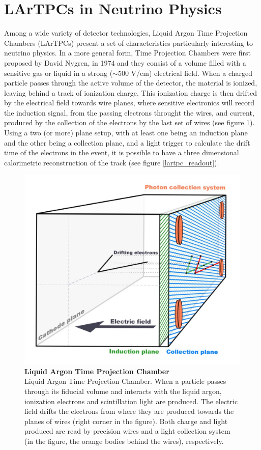 \section{LArTPCs in Neutrino Physics}
Among a wide variety of detector technologies, Liquid Argon Time Projection Chambers (LArTPCs) present a set of characteristics particularly interesting to neutrino physics. 
In a more general form, Time Projection Chambers were first proposed by David Nygren, in 1974 \cite{Nygren} and they consist of a volume filled with a sensitive gas or liquid in a strong ($\sim$500 V/cm) electrical field. When a charged particle passes through the active volume of the detector, the material is ionized, leaving behind a track of ionization charge. This ionization charge is then drifted by the electrical field towards wire planes, where sensitive electronics will record the induction signal, from the passing electrons throught the wires, and current, produced by the collection of the electrons by the last set of wires (see figure \ref{lartpc}). Using a two (or more) plane setup, with at least one being an induction plane and the other being a collection plane, and a light trigger to calculate the drift time of the electrons in the event, it is possible to have a three dimensional calorimetric reconstruction of the track (see figure \ref{lartpc_readout}).

\begin{figure}[h!]
	\begin{center}
		\includegraphics[scale=0.1]{Figures/LARTPC.jpg}
		\caption[LArTPC]{ {\textbf{Liquid Argon Time Projection Chamber}} \\ Liquid Argon Time Projection Chamber. When a particle passes through its fiducial volume and interacts with the liquid argon, ionization electrons and scintillation light are produced. The electric field drifts the electrons from where they are produced towards the planes of wires (right corner in the figure). Both charge and light produced are read by precision wires and a light collection system (in the figure, the orange bodies behind the wires), respectively.}
		\label{lartpc}	
	\end{center}
\end{figure}

